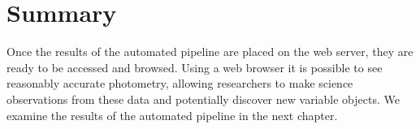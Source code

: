 \section{Summary}
Once the results of the automated pipeline are placed on the web server, they are ready to be accessed and browsed. Using a web browser it is possible to see reasonably accurate photometry, allowing researchers to make science observations from these data and potentially discover new variable objects. We examine the results of the automated pipeline in the next chapter. 

